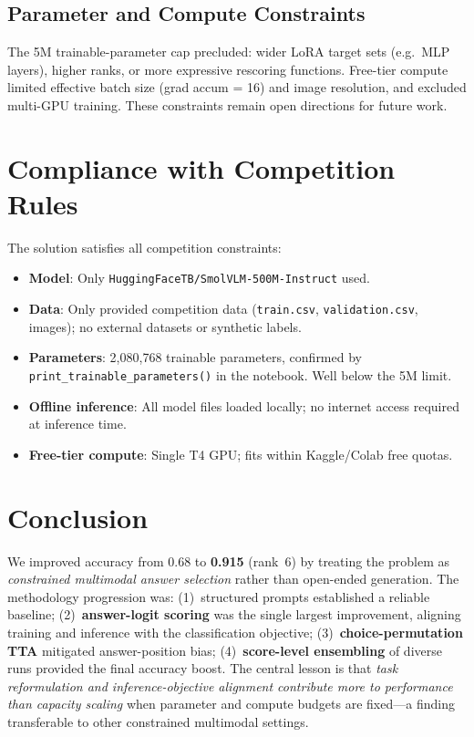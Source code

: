\documentclass[11pt,twocolumn]{article}
\begin{document}
\subsection{Parameter and Compute Constraints}

The 5M trainable-parameter cap precluded: wider LoRA target sets (e.g.\ MLP layers), higher ranks, or more expressive rescoring functions. Free-tier compute limited effective batch size (grad accum = 16) and image resolution, and excluded multi-GPU training. These constraints remain open directions for future work.

\section{Compliance with Competition Rules}

The solution satisfies all competition constraints:
\begin{itemize}[leftmargin=*, noitemsep, topsep=3pt]
  \item \textbf{Model}: Only \texttt{HuggingFaceTB/SmolVLM-500M-Instruct} used.
  \item \textbf{Data}: Only provided competition data (\texttt{train.csv}, \texttt{validation.csv}, images); no external datasets or synthetic labels.
  \item \textbf{Parameters}: 2,080,768 trainable parameters, confirmed by \texttt{print\_trainable\_parameters()} in the notebook. Well below the 5M limit.
  \item \textbf{Offline inference}: All model files loaded locally; no internet access required at inference time.
  \item \textbf{Free-tier compute}: Single T4 GPU; fits within Kaggle/Colab free quotas.
\end{itemize}

\section{Conclusion}

We improved accuracy from 0.68 to \textbf{0.915} (rank~6) by treating the problem as \emph{constrained multimodal answer selection} rather than open-ended generation. The methodology progression was: (1)~structured prompts established a reliable baseline; (2)~\textbf{answer-logit scoring} was the single largest improvement, aligning training and inference with the classification objective; (3)~\textbf{choice-permutation TTA} mitigated answer-position bias; (4)~\textbf{score-level ensembling} of diverse runs provided the final accuracy boost. The central lesson is that \emph{task reformulation and inference-objective alignment contribute more to performance than capacity scaling} when parameter and compute budgets are fixed---a finding transferable to other constrained multimodal settings.
\end{document}
